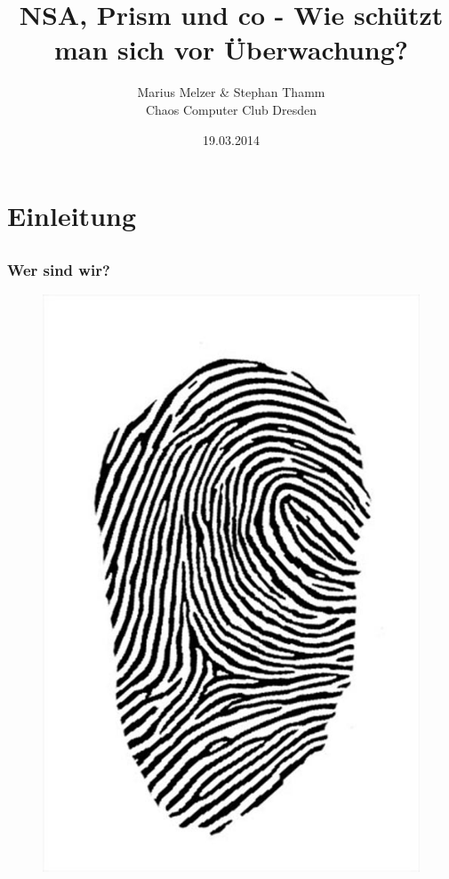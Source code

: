 \documentclass[12pt]{beamer}
\title{NSA, Prism und co - Wie schützt man sich vor Überwachung?}
\author{\small Marius Melzer \& Stephan Thamm\\\large Chaos Computer Club Dresden}
\date{19.03.2014}
\begin{document}
\maketitle

\section{Einleitung}
\subsection{}

\begin{frame}
  \frametitle{Wer sind wir?}
  \begin{figure}
    \includegraphics[height=0.7\textheight]{img/fingerabdruck.jpg}
  \end{figure}
\end{frame}
\end{document}

